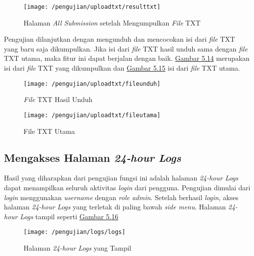 	\begin{figure}[H]
		\centering  
		\texttt{[image: /pengujian/uploadtxt/resulttxt]}  
		\caption[Halaman \textit{All Submission} setelah Mengumpulkan \textit{File} TXT]{Halaman \textit{All Submission} setelah Mengumpulkan \textit{File} TXT} 
		\label{fig:resultttxt} 
	\end{figure}

	Pengujian dilanjutkan dengan mengunduh dan mencocokan isi dari \textit{file} TXT yang baru saja dikumpulkan. Jika isi dari \textit{file} TXT hasil unduh sama dengan \textit{file} TXT utama, maka fitur ini dapat berjalan dengan baik. \hyperref[fig:resultttxt]{Gambar 5.14} merupakan isi dari \textit{file} TXT yang dikumpulkan dan \hyperref[fig:resultttxt]{Gambar 5.15} isi dari \textit{file} TXT utama.
	
	\begin{figure}[H]
		\centering  
		\texttt{[image: /pengujian/uploadtxt/fileunduh]}  
		\caption[\textit{File} TXT Hasil Unduh]{\textit{File} TXT Hasil Unduh} 
		\label{fig:fileunduh} 
	\end{figure}
	
	\begin{figure}[H]
		\centering  
		\texttt{[image: /pengujian/uploadtxt/fileutama]}  
		\caption[File TXT Utama]{File TXT Utama} 
		\label{fig:fileutama} 
	\end{figure}

	\subsection{Mengakses Halaman \textit{24-hour Logs}}
	Hasil yang diharapkan dari pengujian fungsi ini adalah halaman \textit{24-hour Logs} dapat menampilkan seluruh aktivitas \textit{login} dari pengguna. Pengujian dimulai dari \textit{login} menggunakan \textit{username} dengan \textit{role admin}. Setelah berhasil \textit{login}, akses halaman \textit{24-hour Logs} yang terletak di paling bawah \textit{side menu}. Halaman \textit{24-hour Logs} tampil seperti \hyperref[fig:logs]{Gambar 5.16}
	\begin{figure}[H]
		\centering  
		\texttt{[image: /pengujian/logs/logs]}  
		\caption[Halaman \textit{24-hour Logs} yang Tampil]{Halaman \textit{24-hour Logs} yang Tampil} 
		\label{fig:logs} 
	\end{figure}


